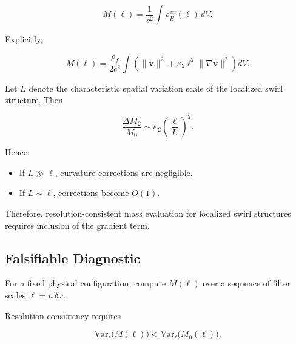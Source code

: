 \documentclass[11pt]{article}
\theoremstyle{definition}
\theoremstyle{plain}
\theoremstyle{remark}
\begin{document}
        \begin{equation}
            M(\ell)
            =
            \frac{1}{c^2}
            \int
            \rho_{\!E}^{\mathrm{eff}}(\ell)\, dV.
            \label{eq:M_ell}
        \end{equation}

        Explicitly,

        \begin{equation}
            M(\ell)
            =
            \frac{\rho_{\!f}}{2c^2}
            \int
            \left(
                \lVert \bar{\mathbf{v}} \rVert^2
            +
                \kappa_2 \ell^2
                \lVert \nabla \bar{\mathbf{v}} \rVert^2
            \right)
            dV.
            \label{eq:M_resolution}
        \end{equation}

        Let $L$ denote the characteristic spatial variation scale
        of the localized swirl structure.
        Then

        \begin{equation}
            \frac{\Delta M_2}{M_0}
            \sim
            \kappa_2
            \left(\frac{\ell}{L}\right)^2.
        \end{equation}

        Hence:

        \begin{itemize}
            \item If $L \gg \ell$, curvature corrections are negligible.
            \item If $L \sim \ell$, corrections become $O(1)$.
        \end{itemize}

        Therefore, resolution-consistent mass evaluation for localized
        swirl structures requires inclusion of the gradient term.


    \subsection{Falsifiable Diagnostic}

        For a fixed physical configuration,
        compute $M(\ell)$ over a sequence of filter scales
        $\ell = n\,\delta x$.

        Resolution consistency requires

        \begin{equation}
            \mathrm{Var}_\ell \big(M(\ell)\big)
            <
            \mathrm{Var}_\ell \big(M_0(\ell)\big).
        \end{equation}
\end{document}
